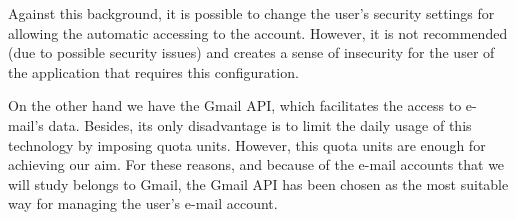 Against this background, it is possible to change the user's security settings for allowing the automatic accessing to the account. However, it is not recommended (due to possible security issues) and creates a sense of insecurity for the user of the application that requires this configuration.

On the other hand we have the Gmail API, which facilitates the access to e-mail's data. Besides, its only disadvantage is to limit the daily usage of this technology by imposing quota units. However, this quota units are enough for achieving our aim. For these reasons, and because of the e-mail accounts that we will study belongs to Gmail, the Gmail API has been chosen as the most suitable way for managing the user's e-mail account.